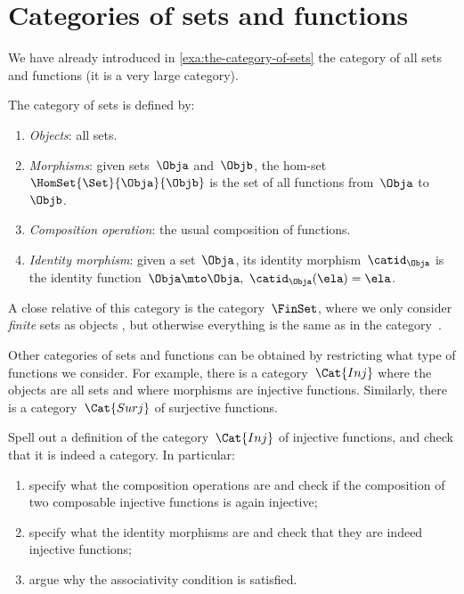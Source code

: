 
\section{Categories of sets and functions}

We have already introduced in \cref{exa:the-category-of-sets} the category of all sets and functions (it is a very large category).

\begin{ctdefinition}
    \label{def:Set}
    The category of sets \iindex{\Set} is defined by:
    \begin{enumerate}
        \item \emph{Objects}: all sets.
        \item \emph{Morphisms}: given sets~$\Obja$ and~$\Objb$, the hom-set~$\HomSet{\Set}{\Obja}{\Objb}$ is the set of all functions from~$\Obja$ to~$\Objb$.
        \item \emph{Composition operation}: the usual composition of functions.
        \item \emph{Identity morphism}: given a set~$\Obja$, its identity morphism~$\catid_\Obja$ is the identity function~$\Obja \mto \Obja, \ \catid_\Obja(\ela) = \ela$.
    \end{enumerate}
\end{ctdefinition}

A close relative of this category is the category~$\FinSet$, where we only consider \emph{finite} sets as objects , but otherwise everything is the same as in the category~\Set.

Other categories of sets and functions can be obtained by restricting what type of functions we consider.
For example, there is a category~$\Cat{Inj}$ where the objects are all sets and where morphisms are injective functions.
Similarly, there is a category~$\Cat{Surj}$ of surjective functions.

\begin{exercise}
    Spell out a definition of the category~$\Cat{Inj}$ of injective functions, and check that it is indeed a category.
    In particular:
    \begin{enumerate}
        \item specify what the composition operations are and check if the composition of two composable injective functions is again injective;
        \item specify what the identity morphisms are and check that they are indeed injective functions;
        \item argue why the associativity condition is satisfied.
    \end{enumerate}
\end{exercise}

